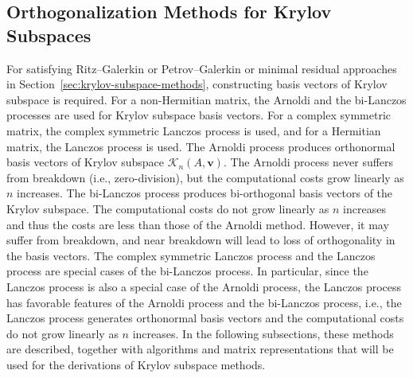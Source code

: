 \subsection{{Orthogonalization Methods for Krylov Subspaces}}\label{sec:krylov-orthogonalization}
{For satisfying Ritz--Galerkin or Petrov--Galerkin or minimal residual approaches in Section~\ref{sec:krylov-subspace-methods}, constructing basis vectors of Krylov subspace is required. For a non-Hermitian matrix, the Arnoldi and the bi-Lanczos processes are used for Krylov subspace basis vectors. For a complex symmetric matrix, the complex symmetric Lanczos process is used, and for a Hermitian matrix, the Lanczos process is used.}
{The Arnoldi process produces orthonormal basis vectors of Krylov subspace $\mathcal K_n(A,\bm v)$. The Arnoldi process never suffers from breakdown (i.e., zero-division), but the computational costs grow linearly as $n$ increases. The bi-Lanczos process produces bi-orthogonal basis vectors of the Krylov subspace. The computational costs do not grow linearly as $n$ increases and thus the costs are less than those of the Arnoldi method. However, it may suffer from breakdown, and near breakdown will lead to loss of orthogonality in the basis vectors. The complex symmetric Lanczos process and the Lanczos process are special cases of the bi-Lanczos process. In particular, since the Lanczos process is also a special case of the Arnoldi process, the Lanczos process has favorable features of the Arnoldi process and the bi-Lanczos process, i.e., the Lanczos process generates orthonormal basis vectors and the computational costs do not grow linearly as $n$ increases.}
{In the following subsections, these methods are described, together with algorithms and matrix representations that will be used for the derivations of Krylov subspace methods.}
